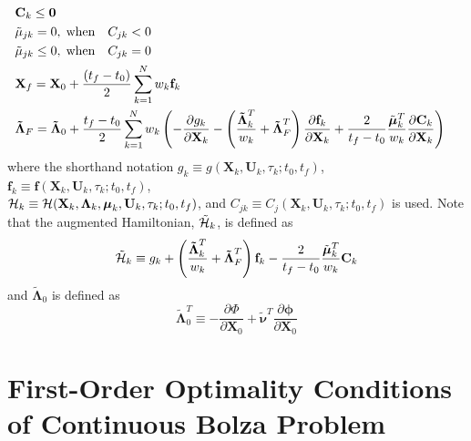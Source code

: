 \documentclass[10pt,final]{report}
\begin{document}
\begin{eqnarray}
  \label{kkt 8}
  &\textbf{C}_k \leq{\bf 0} &\vspace{6pt}\\\label{kkt 9}
  &\tilde\mu_{jk}=0 ,  \; \mbox{when} \quad C_{jk} < 0
  &\vspace{6pt}\\\label{kkt 10}
  &\tilde\mu_{jk}\leq0 , \; \mbox{when} \quad  C_{jk}=0
  &\vspace{6pt}\\\label{kkt 11}
  & \textbf{X}_f = \textbf{X}_0 + \displaystyle\frac{(t_f -
    t_0)}{2} \sum_{k = 1}^N w_k  \textbf{f}_k   &
  \vspace{6pt} \\
  \label{kkt 12}
  & \boldsymbol{\tilde\Lambda}_F = \boldsymbol{\tilde\Lambda}_0 +
  \displaystyle\frac{t_f-t_0}{2} \sum_{k = 1}^N w_k  \left(
    -\frac{\partial g_k}{\partial \textbf{X}_k} -
    \left(\frac{\boldsymbol{\tilde\Lambda}_k^T}{w_k} +
      \boldsymbol{\tilde \Lambda}^T_F \right)  \frac{\partial
      \textbf{f}_k}{\partial \textbf{X}_k} + \frac{2}{t_f-t_0}
    \frac{\tilde{\boldsymbol{\mu}}_k^T}{w_k}
    \frac{\partial \textbf{C}_k}{\partial \textbf{X}_k} \right)
\end{eqnarray}
where the shorthand
notation $g_k \equiv g(\textbf{X}_k,\textbf{U}_k,\tau_k;t_0,t_f)$, $\textbf{f}_k \equiv
\textbf{f}(\textbf{X}_k,\textbf{U}_k,\tau_k;t_0,t_f)$, \\ ${\cal H}_k \equiv {\cal H}(
\textbf{X}_k,\boldsymbol{\Lambda}_k,\boldsymbol{\mu}_k,\textbf{U}_k,\tau_k;t_0,t_f)$,
and $C_{jk} \equiv C_j(\textbf{X}_k,\textbf{U}_k,\tau_k;t_0,t_f)$ is
used. Note that the augmented Hamiltonian, $\tilde {\cal H}_k$, is defined as
\begin{equation}
\tilde {\cal H}_k \equiv g_k +
\left(\displaystyle\frac{\boldsymbol{\tilde\Lambda}_k^T}{w_k} +
\boldsymbol{\tilde \Lambda}^T_F \right)  \textbf{f}_k -
    \frac{2}{t_f-t_0}\frac{\tilde{\boldsymbol{\mu}}_k^T}{w_k}
     \textbf{C}_k
 \end{equation}
and $\boldsymbol{\tilde \Lambda}_0$ is defined as
\begin{equation}\label{KKT_costate_0}
  \boldsymbol{\tilde \Lambda}_0^T \equiv - \displaystyle\frac{\partial
    \Phi}{\partial \textbf{X}_0} + \boldsymbol{\tilde \nu}^T
  \frac{\partial \boldsymbol{\phi}}{\partial \textbf{X}_0}
\end{equation}

\section{First-Order Optimality Conditions of Continuous Bolza Problem
  \label{variational cond}}
\end{document}
